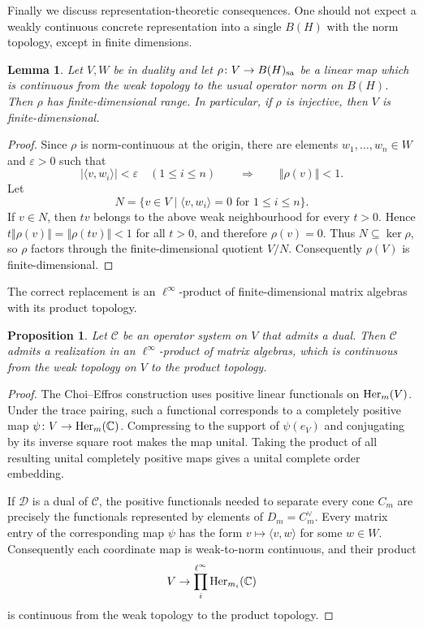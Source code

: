 \documentclass[11pt,onecolumn]{article}
\theoremstyle{plain}
\newtheorem{proposition}[proposition]{Proposition}
\newtheorem{lemma}[lemma]{Lemma}
\theoremstyle{definition}
\begin{document}
Finally we discuss representation-theoretic consequences.  One should not
expect a weakly continuous concrete representation into a single $B(H)$ with
the norm topology, except in finite dimensions.  

\begin{lemma}
    Let $V,W$ be in duality and let $\rho\colon V\to B(H)_{\rm sa}$ be a linear map which is continuous from the weak topology to the usual operator norm on $B(H)$. Then $\rho$ has finite-dimensional range. In particular, if $\rho$ is injective, then $V$ is finite-dimensional.
\end{lemma}
\begin{proof}
    Since $\rho$ is norm-continuous at the origin, there are elements
    $w_1,\ldots,w_n\in W$ and $\varepsilon>0$ such that
    \[
        |\langle v,w_i\rangle|<\varepsilon\quad(1\leqslant i\leqslant n)
        \qquad\Longrightarrow\qquad
        \Vert\rho(v)\Vert<1.
    \]
    Let
    \[
        N=\{v\in V\mid \langle v,w_i\rangle=0\text{ for }1\leqslant i\leqslant n\}.
    \]
    If $v\in N$, then $tv$ belongs to the above weak neighbourhood for every
    $t>0$. Hence $t\Vert\rho(v)\Vert=\Vert\rho(tv)\Vert<1$ for all $t>0$, and
    therefore $\rho(v)=0$. Thus $N\subseteq\ker\rho$, so $\rho$ factors through
    the finite-dimensional quotient $V/N$. Consequently $\rho(V)$ is
    finite-dimensional. 
\end{proof}

The correct replacement is an $\ell^\infty$-product of finite-dimensional matrix algebras with its product topology.

\begin{proposition}
\label{thm:productreal}
    Let $\mathcal C$ be an operator system on $V$ that admits a dual. Then $\mathcal C$ admits a realization
    in an $\ell^\infty$-product of matrix algebras, which is continuous from
    the weak topology on $V$ to the product topology.
\end{proposition}

\begin{proof}
    The Choi--Effros construction uses positive linear functionals on
    ${\rm Her}_m(V)$.  Under the trace pairing, such a functional corresponds
    to a completely positive map $\psi\colon V\to{\rm Her}_m(\mathbb C)$.
    Compressing to the support of $\psi(e_V)$ and conjugating by its inverse
    square root makes the map unital.  Taking the product of all resulting
    unital completely positive maps gives a unital complete order embedding.

    If $\mathcal D$ is a dual of $\mathcal C$, the positive functionals needed
    to separate every cone $C_m$ are precisely the functionals represented by
    elements of $D_m=C_m^\vee$.  Every matrix entry of the corresponding map
    $\psi$ has the form $v\mapsto\langle v,w\rangle$ for some $w\in W$.
    Consequently each coordinate map is weak-to-norm continuous, and their
    product
    \[
        V\to\prod_i^{\ell^\infty}{\rm Her}_{m_i}(\mathbb C)
    \]
    is continuous from the weak topology to the product topology.
\end{proof}
\end{document}
